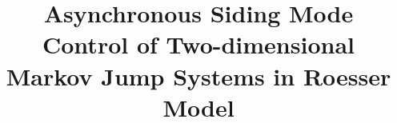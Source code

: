 \documentclass[conference]{IEEEtran}
\begin{document}
%
\title{Asynchronous Siding Mode Control of Two-dimensional Markov Jump Systems in Roesser Model}




% 
\end{document}
